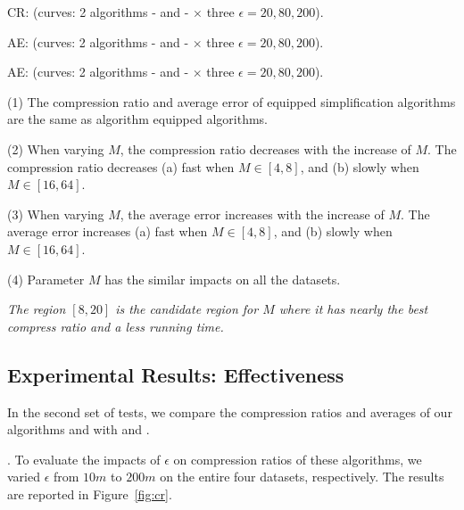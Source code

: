 CR: (\textcolor[rgb]{0.00,0.07,1.00}{curves: 2 algorithms \cista- \rpia and \cista- \cpia $\times$  three $\epsilon = 20, 80, 200$}).

AE: (\textcolor[rgb]{0.00,0.07,1.00}{curves: 2 algorithms \cist - \rpia and \cist - \cpia $\times$  three $\epsilon = 20, 80, 200$}).

AE: (\textcolor[rgb]{0.00,0.07,1.00}{curves: 2 algorithms \cista- \rpia and \cista- \cpia $\times$  three $\epsilon = 20, 80, 200$}).

\ni(1) The compression ratio and average error of \rpia equipped simplification algorithms are the same as algorithm \cpia equipped algorithms.

\ni(2) When varying $M$, the compression ratio decreases with the increase of $M$.
The compression ratio decreases (a) fast when $M \in [4,8]$, and (b) slowly when $M \in [16, 64]$.


\ni(3) When varying $M$, the average error increases with the increase of $M$.
The average error increases (a) fast when $M \in [4,8]$, and (b) slowly when $M \in [16, 64]$.

\ni(4) Parameter $M$ has the similar impacts on all the datasets.

\emph{The region $[8, 20]$ is the candidate region for $M$ where it has nearly the best compress ratio and a less running time.}



\subsection{Experimental Results: Effectiveness}
In the second set of tests, we compare the compression ratios and averages of our algorithms \cist and \cista with \dpa and \squishe.


.
To evaluate the impacts of $\epsilon$ on compression ratios of these algorithms, we varied $\epsilon$ from $10m$ to $200m$ on
 the entire four datasets, respectively.
The results are reported in Figure~\ref{fig:cr}.

